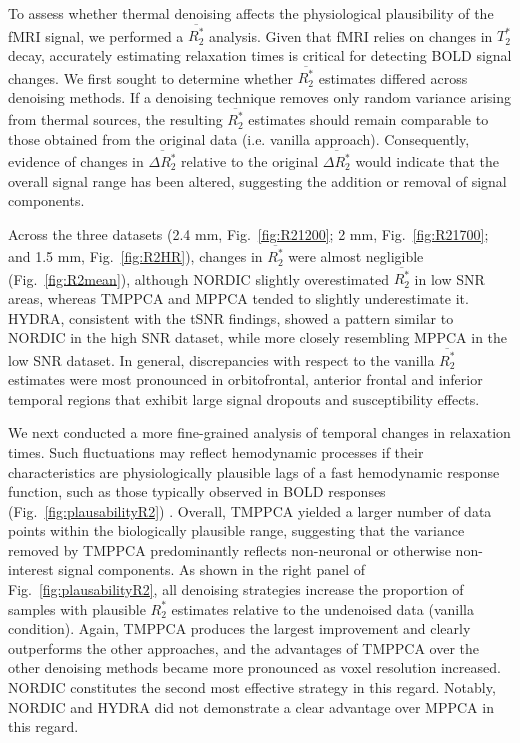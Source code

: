 To assess whether thermal denoising affects the physiological plausibility of the fMRI signal, we performed a $\overline{R_2^*}$ analysis. Given that fMRI relies on changes in $T_2^*$ decay, accurately estimating relaxation times is critical for detecting BOLD signal changes. We first sought to determine whether $\overline{R_2^*}$ estimates differed across denoising methods. If a denoising technique removes only random variance arising from thermal sources, the resulting $\overline{R_2^*}$ estimates should remain comparable to those obtained from the original data (i.e. vanilla approach). Consequently, evidence of changes in $\overline{\Delta R_2^*}$ relative to the original $\overline{\Delta R_2^*}$ would indicate that the overall signal range has been altered, suggesting the addition or removal of signal components.

Across the three datasets (2.4 mm, Fig.~\ref{fig:R21200}; 2 mm, Fig.~\ref{fig:R21700}; and 1.5 mm, Fig.~\ref{fig:R2HR}), changes in $\overline{R_2^*}$ were almost negligible (Fig.~\ref{fig:R2mean}), although NORDIC slightly overestimated $\overline{R_2^*}$ in low SNR areas, whereas TMPPCA and MPPCA tended to slightly underestimate it. HYDRA, consistent with the tSNR findings, showed a pattern similar to NORDIC in the high SNR dataset, while more closely resembling MPPCA in the low SNR dataset. In general, discrepancies with respect to the vanilla $\overline{R_2^*}$ estimates were most pronounced in orbitofrontal, anterior frontal and inferior temporal regions that exhibit large signal dropouts and susceptibility effects.

We next conducted a more fine-grained analysis of temporal changes in relaxation times. Such fluctuations may reflect hemodynamic processes if their characteristics are physiologically  plausible lags of a fast hemodynamic response function, such as those typically observed in BOLD responses (Fig.~\ref{fig:plausabilityR2}) \citep{uludagIntegrativeModelNeuronal2009a, uludagLinkingBrainVascular2018, dezwartTemporalDynamicsBOLD2005}. Overall, TMPPCA yielded a larger number of data points within the biologically plausible range, suggesting that the variance removed by TMPPCA predominantly reflects non-neuronal or otherwise non-interest signal components. As shown in the right panel of Fig.~\ref{fig:plausabilityR2}, all denoising strategies increase the proportion of samples with plausible $R_{2}^{*}$ estimates relative to the undenoised data (vanilla condition). Again, TMPPCA produces the largest improvement and clearly outperforms the other approaches, and the advantages of TMPPCA over the other denoising methods became more pronounced as voxel resolution increased. NORDIC constitutes the second most effective strategy in this regard. Notably, NORDIC and HYDRA did not demonstrate a clear advantage over MPPCA in this regard.


